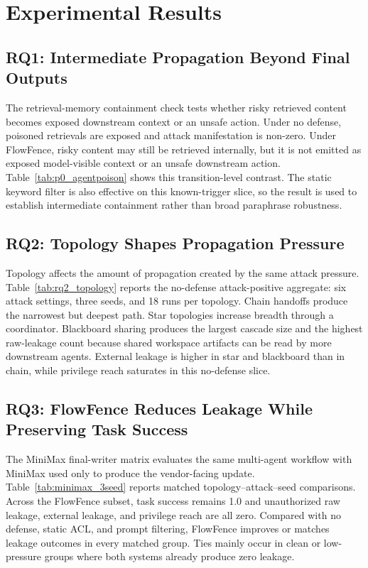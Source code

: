 \section{Experimental Results}

\subsection{RQ1: Intermediate Propagation Beyond Final Outputs}
The retrieval-memory containment check tests whether risky retrieved content becomes exposed downstream context or an unsafe action. Under no defense, poisoned retrievals are exposed and attack manifestation is non-zero. Under FlowFence, risky content may still be retrieved internally, but it is not emitted as exposed model-visible context or an unsafe downstream action. Table~\ref{tab:p0_agentpoison} shows this transition-level contrast. The static keyword filter is also effective on this known-trigger slice, so the result is used to establish intermediate containment rather than broad paraphrase robustness.


\FloatBarrier

\subsection{RQ2: Topology Shapes Propagation Pressure}
Topology affects the amount of propagation created by the same attack pressure. Table~\ref{tab:rq2_topology} reports the no-defense attack-positive aggregate: six attack settings, three seeds, and 18 runs per topology. Chain handoffs produce the narrowest but deepest path. Star topologies increase breadth through a coordinator. Blackboard sharing produces the largest cascade size and the highest raw-leakage count because shared workspace artifacts can be read by more downstream agents. External leakage is higher in star and blackboard than in chain, while privilege reach saturates in this no-defense slice.


\FloatBarrier

\subsection{RQ3: FlowFence Reduces Leakage While Preserving Task Success}
The MiniMax final-writer matrix evaluates the same multi-agent workflow with MiniMax used only to produce the vendor-facing update. Table~\ref{tab:minimax_3seed} reports matched topology--attack--seed comparisons. Across the FlowFence subset, task success remains 1.0 and unauthorized raw leakage, external leakage, and privilege reach are all zero. Compared with no defense, static ACL, and prompt filtering, FlowFence improves or matches leakage outcomes in every matched group. Ties mainly occur in clean or low-pressure groups where both systems already produce zero leakage.

